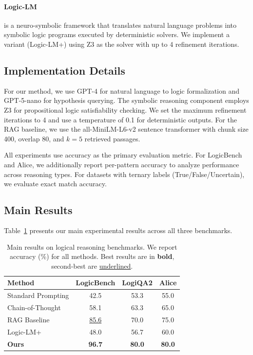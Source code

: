\paragraph{Logic-LM} \citep{pan2023logiclm} is a neuro-symbolic framework that translates natural language problems into symbolic logic programs executed by deterministic solvers. We implement a variant (Logic-LM+) using Z3 as the solver with up to 4 refinement iterations.

\subsection{Implementation Details}
\label{subsec:implementation}

For our method, we use GPT-4 for natural language to logic formalization and GPT-5-nano for hypothesis querying. The symbolic reasoning component employs Z3 \citep{demoura2008z3} for propositional logic satisfiability checking. We set the maximum refinement iterations to 4 and use a temperature of 0.1 for deterministic outputs. For the RAG baseline, we use the all-MiniLM-L6-v2 sentence transformer with chunk size 400, overlap 80, and $k=5$ retrieved passages.

All experiments use accuracy as the primary evaluation metric. For LogicBench and Alice, we additionally report per-pattern accuracy to analyze performance across reasoning types. For datasets with ternary labels (True/False/Uncertain), we evaluate exact match accuracy.

\subsection{Main Results}
\label{subsec:main_results}

Table~\ref{tab:main_results} presents our main experimental results across all three benchmarks.

\begin{table}[t]
\centering
\caption{Main results on logical reasoning benchmarks. We report accuracy (\%) for all methods. Best results are in \textbf{bold}, second-best are \underline{underlined}.}
\label{tab:main_results}
\begin{tabular}{lccc}
\toprule
\textbf{Method} & \textbf{LogicBench} & \textbf{LogiQA2} & \textbf{Alice} \\
\midrule
Standard Prompting & 42.5 & 53.3 & 55.0 \\
Chain-of-Thought & 58.1 & 63.3 & 65.0 \\
RAG Baseline & \underline{85.6} & 70.0 & 75.0 \\
Logic-LM+ & 48.0 & 56.7 & 60.0 \\
\midrule
\textbf{Ours} & \textbf{96.7} & \textbf{80.0} & \textbf{80.0} \\
\bottomrule
\end{tabular}
\end{table}

